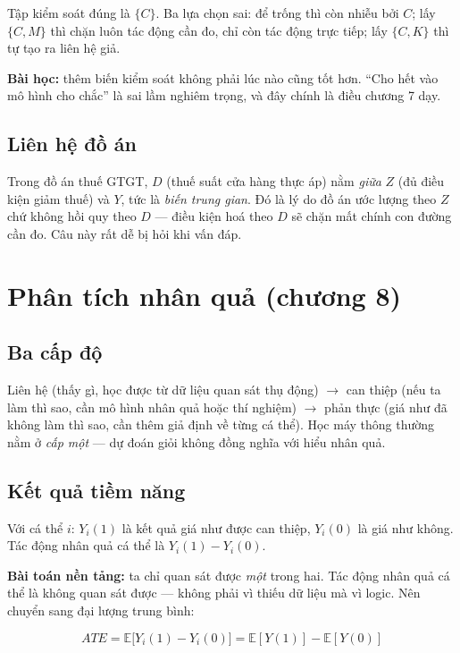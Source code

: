 \documentclass[11pt]{article}
\begin{document}
Tập kiểm soát đúng là $\{C\}$. Ba lựa chọn sai: để trống thì còn nhiễu bởi $C$;
lấy $\{C,M\}$ thì chặn luôn tác động cần đo, chỉ còn tác động trực tiếp; lấy
$\{C,K\}$ thì tự tạo ra liên hệ giả.

\textbf{Bài học:} thêm biến kiểm soát không phải lúc nào cũng tốt hơn. ``Cho hết
vào mô hình cho chắc'' là sai lầm nghiêm trọng, và đây chính là điều chương 7 dạy.

\subsection*{Liên hệ đồ án}

Trong đồ án thuế GTGT, $D$ (thuế suất cửa hàng thực áp) nằm \emph{giữa} $Z$ (đủ
điều kiện giảm thuế) và $Y$, tức là \emph{biến trung gian}. Đó là lý do đồ án ước
lượng theo $Z$ chứ không hồi quy theo $D$ --- điều kiện hoá theo $D$ sẽ chặn mất
chính con đường cần đo. Câu này rất dễ bị hỏi khi vấn đáp.

\section{Phân tích nhân quả (chương 8)}

\subsection*{Ba cấp độ}

Liên hệ (thấy gì, học được từ dữ liệu quan sát thụ động) $\to$ can thiệp (nếu ta
làm thì sao, cần mô hình nhân quả hoặc thí nghiệm) $\to$ phản thực (giá như đã
không làm thì sao, cần thêm giả định về từng cá thể). Học máy thông thường nằm ở
\emph{cấp một} --- dự đoán giỏi không đồng nghĩa với hiểu nhân quả.

\subsection*{Kết quả tiềm năng}

Với cá thể $i$: $Y_i(1)$ là kết quả giá như được can thiệp, $Y_i(0)$ là giá như
không. Tác động nhân quả cá thể là $Y_i(1)-Y_i(0)$.

\textbf{Bài toán nền tảng:} ta chỉ quan sát được \emph{một} trong hai. Tác động
nhân quả cá thể là không quan sát được --- không phải vì thiếu dữ liệu mà vì
logic. Nên chuyển sang đại lượng trung bình:

\[
ATE = \mathbb{E}\bigl[Y_i(1)-Y_i(0)\bigr] = \mathbb{E}[Y(1)] - \mathbb{E}[Y(0)]
\]
\end{document}
